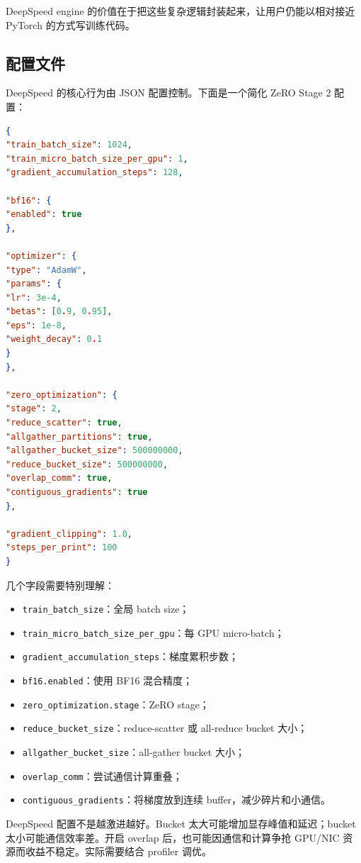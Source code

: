 DeepSpeed engine 的价值在于把这些复杂逻辑封装起来，让用户仍能以相对接近 PyTorch 的方式写训练代码。

\subsection{配置文件}
\label{subsec:deepspeed-config}

DeepSpeed 的核心行为由 JSON 配置控制。下面是一个简化 ZeRO Stage 2 配置：

\begin{lstlisting}[language=json,caption={DeepSpeed ZeRO Stage 2 配置示例},label={lst:deepspeed-zero2-config}]
{
"train_batch_size": 1024,
"train_micro_batch_size_per_gpu": 1,
"gradient_accumulation_steps": 128,

"bf16": {
"enabled": true
},

"optimizer": {
"type": "AdamW",
"params": {
"lr": 3e-4,
"betas": [0.9, 0.95],
"eps": 1e-8,
"weight_decay": 0.1
}
},

"zero_optimization": {
"stage": 2,
"reduce_scatter": true,
"allgather_partitions": true,
"allgather_bucket_size": 500000000,
"reduce_bucket_size": 500000000,
"overlap_comm": true,
"contiguous_gradients": true
},

"gradient_clipping": 1.0,
"steps_per_print": 100
}
\end{lstlisting}

几个字段需要特别理解：

\begin{itemize}
\item \texttt{train_batch_size}：全局 batch size；
\item \texttt{train_micro_batch_size_per_gpu}：每 GPU micro-batch；
\item \texttt{gradient_accumulation_steps}：梯度累积步数；
\item \texttt{bf16.enabled}：使用 BF16 混合精度；
\item \texttt{zero_optimization.stage}：ZeRO stage；
\item \texttt{reduce_bucket_size}：reduce-scatter 或 all-reduce bucket 大小；
\item \texttt{allgather_bucket_size}：all-gather bucket 大小；
\item \texttt{overlap_comm}：尝试通信计算重叠；
\item \texttt{contiguous_gradients}：将梯度放到连续 buffer，减少碎片和小通信。
\end{itemize}

DeepSpeed 配置不是越激进越好。Bucket 太大可能增加显存峰值和延迟；bucket 太小可能通信效率差。开启 overlap 后，也可能因通信和计算争抢 GPU/NIC 资源而收益不稳定。实际需要结合 profiler 调优。

